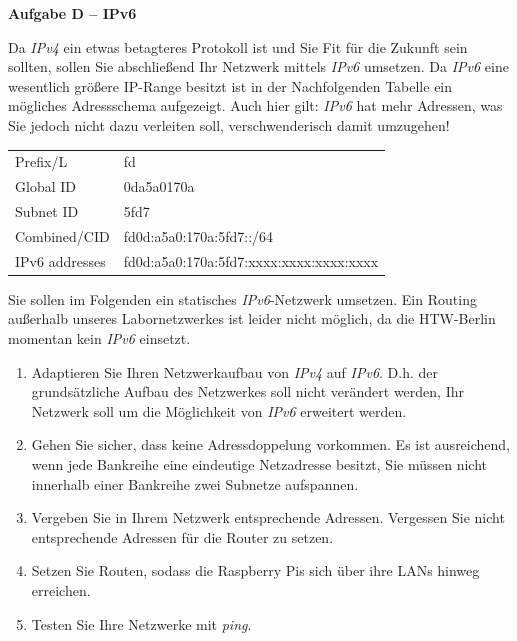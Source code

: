 \documentclass[paper=a4,fontsize=11pt]{scrartcl}%
\numberwithin{equation}{section}
\begin{document}
\begin{center}\Large{\textbf{Aufgabe D -- IPv6}}\end{center}\vskip0.25in
Da \emph{IPv4} ein etwas betagteres Protokoll ist und Sie Fit für die Zukunft sein sollten, sollen Sie abschließend Ihr Netzwerk mittels \emph{IPv6} umsetzen. Da \emph{IPv6} eine wesentlich größere IP-Range besitzt ist in der Nachfolgenden Tabelle ein mögliches Adressschema aufgezeigt. Auch hier gilt: \emph{IPv6} hat mehr Adressen, was Sie jedoch nicht dazu verleiten soll, verschwenderisch damit umzugehen!
\begin{table}[H]
\centering
\begin{tabular}{ll}
 Prefix/L & fd  \\
 Global ID & 0da5a0170a \\
 Subnet ID &  5fd7\\
 Combined/CID & fd0d:a5a0:170a:5fd7::/64 \\
 IPv6 addresses & fd0d:a5a0:170a:5fd7:xxxx:xxxx:xxxx:xxxx 
\end{tabular}
\end{table}
Sie sollen im Folgenden ein statisches \emph{IPv6}-Netzwerk umsetzen. Ein Routing außerhalb unseres Labornetzwerkes ist leider nicht möglich, da die HTW-Berlin momentan kein \emph{IPv6} einsetzt.
\begin{enumerate}
	\item Adaptieren Sie Ihren Netzwerkaufbau von \emph{IPv4} auf \emph{IPv6}. D.h. der grundsätzliche Aufbau des Netzwerkes soll nicht verändert werden, Ihr Netzwerk soll um die Möglichkeit von \emph{IPv6} erweitert werden.
	\item Gehen Sie sicher, dass keine Adressdoppelung vorkommen. Es ist ausreichend, wenn jede Bankreihe eine eindeutige Netzadresse besitzt, Sie müssen nicht innerhalb einer Bankreihe zwei Subnetze aufspannen.
	\item Vergeben Sie in Ihrem Netzwerk entsprechende Adressen. Vergessen Sie nicht entsprechende Adressen für die Router zu setzen.
	\item Setzen Sie Routen, sodass die Raspberry Pis sich über ihre LANs hinweg erreichen.
	\item Testen Sie Ihre Netzwerke mit \emph{ping}.
\end{enumerate}
\end{document}
